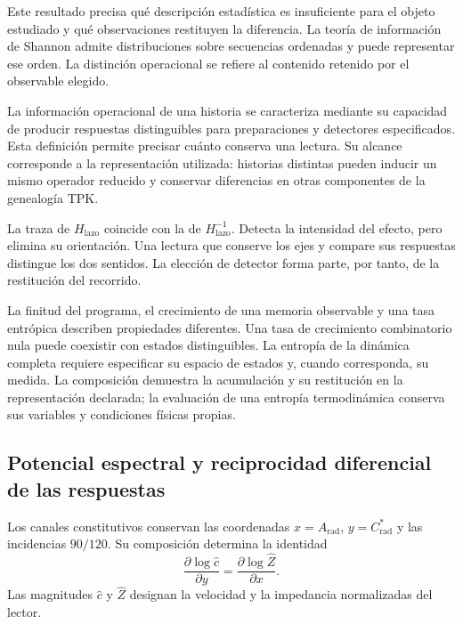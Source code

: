 Este resultado precisa qué descripción estadística es insuficiente
para el objeto estudiado y qué observaciones restituyen la diferencia.
La teoría de información de Shannon admite distribuciones sobre
secuencias ordenadas y puede representar ese orden. La distinción
operacional se refiere al contenido retenido por el observable elegido.

La información operacional de una historia se caracteriza mediante
su capacidad de producir respuestas distinguibles para preparaciones
y detectores especificados. Esta definición permite precisar cuánto
conserva una lectura. Su alcance corresponde a la representación
utilizada: historias distintas pueden inducir un mismo operador
reducido y conservar diferencias en otras componentes de la genealogía
TPK.

La traza de $H_{\mathrm{lazo}}$ coincide con la de
$H_{\mathrm{lazo}}^{-1}$. Detecta la intensidad del efecto, pero elimina
su orientación. Una lectura que conserve los ejes y compare sus
respuestas distingue los dos sentidos. La elección de detector forma
parte, por tanto, de la restitución del recorrido.

La finitud del programa, el crecimiento de una memoria observable y
una tasa entrópica describen propiedades diferentes. Una tasa de
crecimiento combinatorio nula puede coexistir con estados distinguibles.
La entropía de la dinámica completa requiere especificar su espacio
de estados y, cuando corresponda, su medida. La composición demuestra
la acumulación y su restitución en la representación declarada;
la evaluación de una entropía termodinámica conserva sus variables
y condiciones físicas propias.

\subsection{Potencial espectral y reciprocidad diferencial de las respuestas}
\label{subsec:narrativa-potencial-espectral}

Los canales constitutivos conservan las coordenadas
$x=A_{\mathrm{rad}}$, $y=C^*_{\mathrm{rad}}$ y las incidencias $90/120$.
Su composición determina la identidad
\begin{equation}
 \boxed{
 \frac{\partial\log\widehat c}{\partial y}
 =\frac{\partial\log\widehat Z}{\partial x}.}
 \label{eq:narrativa-reciprocidad-diferencial}
\end{equation}
Las magnitudes $\widehat c$ y $\widehat Z$ designan la velocidad y la
impedancia normalizadas del lector.

